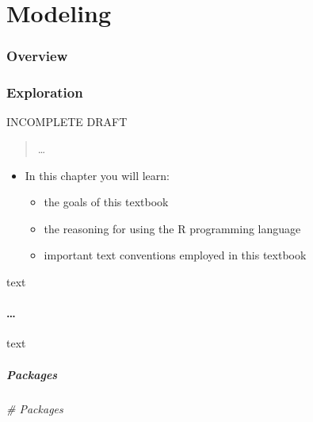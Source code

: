 \documentclass[
]{article}
\newenvironment{Shaded}{\begin{snugshade}}{\end{snugshade}}
\newcommand{\CommentTok}[1]{\textcolor[rgb]{0.56,0.35,0.01}{\textit{#1}}}
\providecommand{\tightlist}{%
  \setlength{\itemsep}{0pt}\setlength{\parskip}{0pt}}
\newenvironment{rmdblock}[1]
  {\begin{shaded*}
  \begin{itemize}
  \renewcommand{\labelitemi}{
    \raisebox{-.5\height}[0pt][0pt]{
      {\setkeys{Gin}{width=2em,keepaspectratio}\texttt{[image: assets/images/\#1]}}
    }
  }
  \item
  }
  {
  \end{itemize}
  \end{shaded*}
  }
\newenvironment{rmdkey}
  {\begin{rmdblock}{key}}
  {\end{rmdblock}}
\begin{document}
\hypertarget{part-modeling}{%
\part{Modeling}\label{part-modeling}}

\hypertarget{modeling-overview}{%
\section*{Overview}\label{modeling-overview}}

\hypertarget{exploration}{%
\section{Exploration}\label{exploration}}

INCOMPLETE DRAFT

\begin{quote}
\ldots{}
\end{quote}

\begin{rmdkey}
In this chapter you will learn:

\begin{itemize}
\tightlist
\item
  the goals of this textbook
\item
  the reasoning for using the R programming language
\item
  important text conventions employed in this textbook
\end{itemize}
\end{rmdkey}

text

\hypertarget{section-3}{%
\subsection{\ldots{}}\label{section-3}}

text

\hypertarget{exploration-packages}{%
\subsubsection{Packages}\label{exploration-packages}}

\begin{Shaded}
\begin{Highlighting}[]
\CommentTok{\# Packages}
\end{Highlighting}
\end{Shaded}
\end{document}
